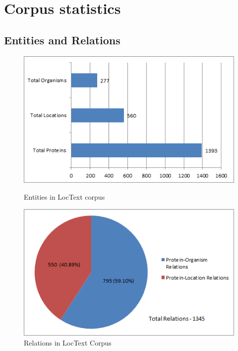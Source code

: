 \section{Corpus statistics}\label{sec:corpusStats}


\subsection*{Entities and Relations}

\begin{figure}
\centering
\begin{minipage}{.5\textwidth}
  \centering
  \includegraphics[width=.95\textwidth]{figures/ProtLocOrg_Distribution.png}
  \caption{Entities in LocText corpus}
  \label{fig:LocText_Entities}
\end{minipage}%
\begin{minipage}{.5\textwidth}
  \centering
  \includegraphics[width=.95\textwidth]{figures/AllRelationsPie.png}
  \caption{Relations in LocText Corpus}
  \label{fig:LocText_Relations}
\end{minipage}
\end{figure}

